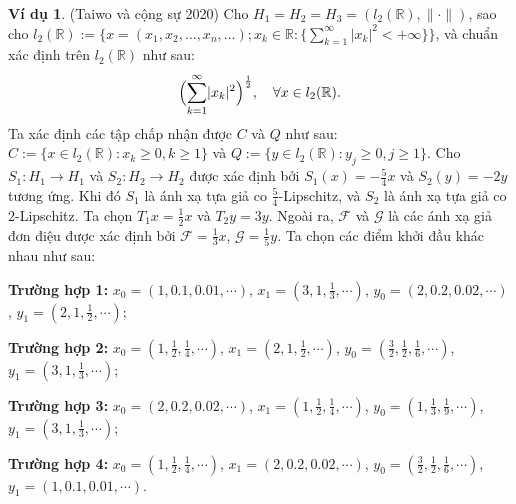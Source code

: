 \documentclass{MyBook}
\theoremstyle{plain}
\theoremstyle{definition}
\newtheorem{example}[theorem]{Ví dụ}
\theoremstyle{remark}
\numberwithin{equation}{chapter}
\newcommand{\Fc}{\mathcal{F}}
\newcommand{\Gc}{\mathcal{G}}
\newcommand{\nm}[1]{\lVert #1\rVert}
\newcommand{\abs}[1]{\lvert #1\rvert}
\newcommand{\R}{\mathbb{R}}
\begin{document}
\begin{example}\label{ex:5.2}
(Taiwo và cộng sự 2020) Cho $H_1=H_2=H_3=(l_2(\R),\nm{\cdot})$, sao cho $l_2(\R):=\{x=(x_1,x_2,\ldots,x_n,\ldots);x_k\in\R:\{\sum_{k=1}^{\infty}\abs{x_k}^2<+\infty\}\}$, và chuẩn xác định trên $l_2(\R)$ như sau:
\[
\Bigl(\sum_{k=1}^{\infty}\abs{x_k}^2\Bigr)^{\frac{1}{2}},\quad\forall x\in l_2(\R).
\]
Ta xác định các tập chấp nhận được $C$ và $Q$ như sau: $C:=\{x\in l_2(\R):x_k\ge 0,k\ge 1\}$ và $Q:=\{y\in l_2(\R):y_j\ge 0,j\ge 1\}$. Cho $S_1:H_1\to H_1$ và $S_2:H_2\to H_2$ được xác định bởi $S_1(x)=-\tfrac{5}{4}x$ và $S_2(y)=-2y$ tương ứng. Khi đó $S_1$ là ánh xạ tựa giả co $\tfrac{5}{4}$-Lipschitz, và $S_2$ là ánh xạ tựa giả co $2$-Lipschitz. Ta chọn $T_1x=\tfrac{1}{2}x$ và $T_2y=3y$. Ngoài ra, $\Fc$ và $\Gc$ là các ánh xạ giả đơn điệu được xác định bởi $\Fc=\tfrac{1}{3}x$, $\Gc=\tfrac{1}{5}y$. Ta chọn các điểm khởi đầu khác nhau như sau:

\noindent\textbf{Trường hợp 1:} $x_0=(1,0.1,0.01,\cdots)$, $x_1=(3,1,\tfrac{1}{3},\cdots)$, $y_0=(2,0.2,0.02,\cdots)$, $y_1=(2,1,\tfrac{1}{2},\cdots)$;

\noindent\textbf{Trường hợp 2:} $x_0=(1,\tfrac{1}{2},\tfrac{1}{4},\cdots)$, $x_1=(2,1,\tfrac{1}{2},\cdots)$, $y_0=(\tfrac{3}{2},\tfrac{1}{2},\tfrac{1}{6},\cdots)$, $y_1=(3,1,\tfrac{1}{3},\cdots)$;

\noindent\textbf{Trường hợp 3:} $x_0=(2,0.2,0.02,\cdots)$, $x_1=(1,\tfrac{1}{2},\tfrac{1}{4},\cdots)$, $y_0=(1,\tfrac{1}{3},\tfrac{1}{9},\cdots)$, $y_1=(3,1,\tfrac{1}{3},\cdots)$;

\noindent\textbf{Trường hợp 4:} $x_0=(1,\tfrac{1}{2},\tfrac{1}{4},\cdots)$, $x_1=(2,0.2,0.02,\cdots)$, $y_0=(\tfrac{3}{2},\tfrac{1}{2},\tfrac{1}{6},\cdots)$, $y_1=(1,0.1,0.01,\cdots)$.
\end{example}
\end{document}
